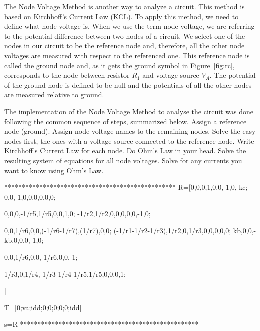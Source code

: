 The Node Voltage Method is another way to analyze a circuit. This method is based on Kirchhoff's Current Law (KCL). To apply this method, we need to define what node voltage is. When we use the term node voltage, we are referring to the potential difference between two nodes of a circuit. We select one of the nodes in our circuit to be the reference node and, therefore, all the other node voltages are measured with respect to the referenced one. This reference node is called the ground node and, as it gets the ground symbol in Figure~\ref{fig:rc}, corresponds to the node between resistor $R_1$ and voltage source $V_A$. The potential of the ground node is defined to be null and the potentials of all the other nodes are measured relative to ground.

The implementation of the Node Voltage Method to analyse the circuit was done following the common sequence of steps, summarized below.
    Assign a reference node (ground).
    Assign node voltage names to the remaining nodes.
    Solve the easy nodes first, the ones with a voltage source connected to the reference node.
    Write Kirchhoff's Current Law for each node. Do Ohm's Law in your head.
    Solve the resulting system of equations for all node voltages.
    Solve for any currents you want to know using Ohm's Law.



*************************************************
R=[0,0,0,1,0,0,-1,0,-kc;
 0,0,-1,0,0,0,0,0,0;

 
0,0,0,-1/r5,1/r5,0,0,1,0;
-1/r2,1/r2,0,0,0,0,0,-1,0;
  
  
   0,0,1/r6,0,0,(-1/r6-1/r7),(1/r7),0,0;
  (-1/r1-1/r2-1/r3),1/r2,0,1/r3,0,0,0,0,0;
  kb,0,0,-kb,0,0,0,-1,0;
  
  0,0,1/r6,0,0,-1/r6,0,0,-1;
  
  1/r3,0,1/r4,-1/r3-1/r4-1/r5,1/r5,0,0,0,1;
  
  ]

T=[0;va;idd;0;0;0;0;0;idd]

s=R\T
***************************************************

